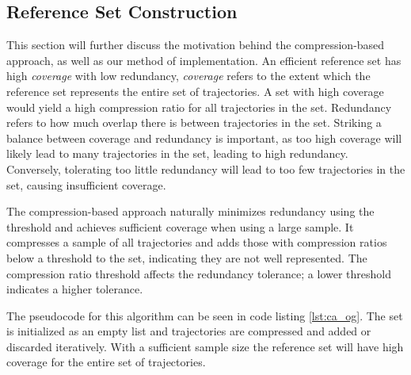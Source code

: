 \subsection{Reference Set Construction}
This section will further discuss the motivation behind the compression-based approach, as well as our method of implementation. An efficient reference set has high \textit{coverage} with low redundancy, \textit{coverage} refers to the extent which the reference set represents the entire set of trajectories. A set with high coverage would yield a high compression ratio for all trajectories in the set. Redundancy refers to how much overlap there is between trajectories in the set. Striking a balance between coverage and redundancy is important, as too high coverage will likely lead to many trajectories in the set, leading to high redundancy. Conversely, tolerating too little redundancy will lead to too few trajectories in the set, causing insufficient coverage.

The compression-based approach naturally minimizes redundancy using the threshold and achieves sufficient coverage when using a large sample. It compresses a sample of all trajectories and adds those with compression ratios below a threshold to the set, indicating they are not well represented. The compression ratio threshold affects the redundancy tolerance; a lower threshold indicates a higher tolerance.

The pseudocode for this algorithm can be seen in code listing \ref{lst:ca_og}. The set is initialized as an empty list and trajectories are compressed and added or discarded iteratively. With a sufficient sample size the reference set will have high coverage for the entire set of trajectories.


